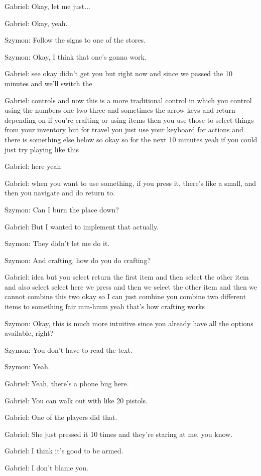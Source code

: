 Gabriel: Okay, let me just...

Gabriel: Okay, yeah.

Szymon: Follow the signs to one of the stores.

Szymon: Okay, I think that one's gonna work.

Gabriel: see okay didn't get you but right now and since we passed the 10 minutes and we'll switch the

Gabriel: controls and now this is a more traditional control in which you control using the numbers one two three and sometimes the arrow keys and return depending on if you're crafting or using items then you use those to select things from your inventory but for travel you just use your keyboard for actions and there is something else below so okay so for the next 10 minutes yeah if you could just try playing like this

Gabriel: here yeah

Gabriel: when you want to use something, if you press it, there's like a small, and then you navigate and do return to.

Szymon: Can I burn the place down?

Gabriel: But I wanted to implement that actually.

Szymon: They didn't let me do it.

Szymon: And crafting, how do you do crafting?

Gabriel: idea but you select return the first item and then select the other item and also select select here we press and then we select the other item and then we cannot combine this two okay so I can just combine you combine two different items to something fair mm-hmm yeah that's how crafting works

Szymon: Okay, this is much more intuitive since you already have all the options available, right?

Szymon: You don't have to read the text.

Szymon: Yeah.

Gabriel: Yeah, there's a phone bug here.

Gabriel: You can walk out with like 20 pistols.

Gabriel: One of the players did that.

Gabriel: She just pressed it 10 times and they're staring at me, you know.

Gabriel: I think it's good to be armed.

Gabriel: I don't blame you.

